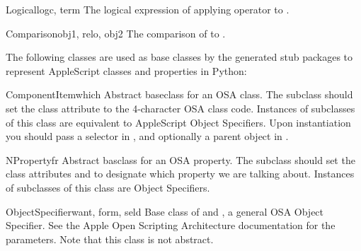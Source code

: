 \begin{classdesc}{Logical}{logc, term}
The logical expression of applying operator  to
.
\end{classdesc}

\begin{classdesc}{Comparison}{obj1, relo, obj2}
The comparison  of  to .
\end{classdesc}

The following classes are used as base classes by the generated stub
packages to represent AppleScript classes and properties in Python:

\begin{classdesc}{ComponentItem}{which}
Abstract baseclass for an OSA class. The subclass should set the class
attribute  to the 4-character OSA class code. Instances of
subclasses of this class are equivalent to AppleScript Object
Specifiers. Upon instantiation you should pass a selector in
, and optionally a parent object in .
\end{classdesc}

\begin{classdesc}{NProperty}{fr}
Abstract basclass for an OSA property. The subclass should set the class
attributes  and  to designate which property we
are talking about. Instances of subclasses of this class are Object
Specifiers.
\end{classdesc}

\begin{classdesc}{ObjectSpecifier}{want, form, seld}
Base class of  and , a general
OSA Object Specifier. See the Apple Open Scripting Architecture
documentation for the parameters. Note that this class is not abstract.
\end{classdesc}

